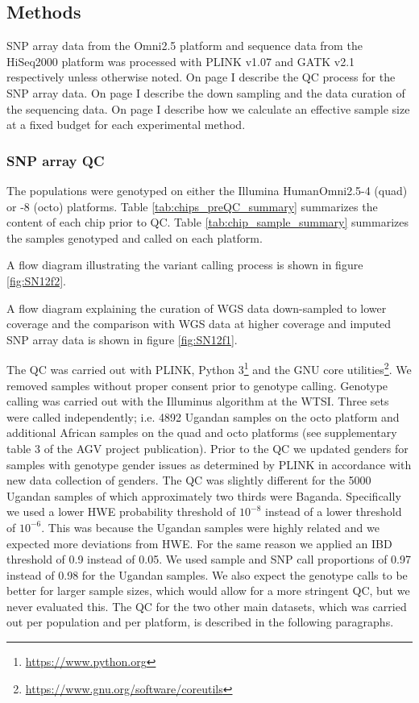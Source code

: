 \subsection{Methods}

SNP array data from the Omni2.5 platform and sequence data from the HiSeq2000 platform was processed with PLINK v1.07\cite{Purcell2007} and \gls{GATK} v2.1 respectively unless otherwise noted. On page \pageref{subsec:chipQC} I describe the QC process for the SNP array data. On page \pageref{subsec:sequence} I describe the down sampling and the data curation of the sequencing data. On page \pageref{subsec:samplesize} I describe how we calculate an effective sample size at a fixed budget for each experimental method.

\subsubsection{SNP array QC}
\label{subsec:chipQC}
The populations were genotyped on either the Illumina HumanOmni2.5-4 (quad) or -8 (octo) platforms. Table \ref{tab:chips_preQC_summary} summarizes the content of each chip prior to QC. Table \ref{tab:chip_sample_summary} summarizes the samples genotyped and called on each platform.



A flow diagram illustrating the variant calling process is shown in figure \ref{fig:SN12f2}.


A flow diagram explaining the curation of \gls{WGS} data down-sampled to lower coverage and the comparison with \gls{WGS} data at higher coverage and imputed SNP array data is shown in figure \ref{fig:SN12f1}.


The \gls{QC} was carried out with PLINK\cite{Purcell2007}, Python 3\footnote{\url{https://www.python.org}} and the GNU core utilities\footnote{\url{https://www.gnu.org/software/coreutils}}. We removed samples without proper consent prior to genotype calling. Genotype calling was carried out with the Illuminus algorithm at the \gls{WTSI}. Three sets were called independently; i.e. 4892 Ugandan samples on the octo platform and additional African samples on the quad and octo platforms (see supplementary table 3 of the AGV project publication\cite{Gurdasani2015}). Prior to the \gls{QC} we updated genders for samples with genotype gender issues as determined by PLINK in accordance with new data collection of genders. The QC was slightly different for the 5000 Ugandan samples of which approximately two thirds were Baganda. Specifically we used a lower \gls{HWE} probability threshold of $10^{-8}$ instead of a lower threshold of $10^{-6}$. This was because the Ugandan samples were highly related and we expected more deviations from \gls{HWE}. For the same reason we applied an IBD threshold of 0.9 instead of 0.05. We used sample and SNP call proportions of 0.97 instead of 0.98 for the Ugandan samples. We also expect the genotype calls to be better for larger sample sizes, which would allow for a more stringent QC, but we never evaluated this. The QC for the two other main datasets, which was carried out per population and per platform, is described in the following paragraphs.

